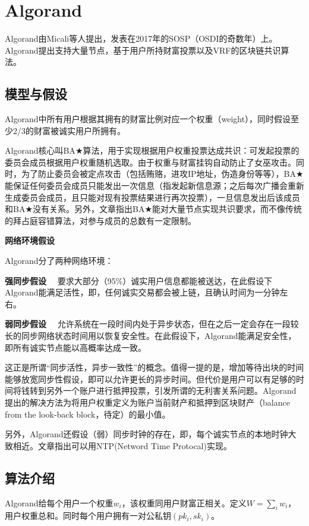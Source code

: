 \section{Algorand}
Algorand由Micali等人提出，发表在2017年的SOSP（OSDI的奇数年）上\cite{gilad2017algorand}。Algorand提出支持大量节点，基于用户所持财富投票以及VRF的区块链共识算法。	
\subsection{模型与假设}
Algorand中所有用户根据其拥有的财富比例对应一个权重（weight），同时假设至少2/3的财富被诚实用户所拥有。	

Algorand核心叫BA$\bigstar$算法，用于实现根据用户权重投票达成共识：可发起投票的委员会成员根据用户权重随机选取。由于权重与财富挂钩自动防止了女巫攻击。同时，为了防止委员会被定点攻击（包括贿赂，进攻IP地址，伪造身份等等），BA$\bigstar$能保证任何委员会成员只能发出一次信息（指发起新信息源；之后每次广播会重新生成委员会成员，且只能对现有投票结果进行再次投票），一旦信息发出后该成员和BA$\bigstar$没有关系。另外，文章指出BA$\bigstar$能对大量节点实现共识要求，而不像传统的拜占庭容错算法，对参与成员的总数有一定限制。

\textbf{网络环境假设}

Algorand分了两种网络环境：

\textbf{强同步假设} ~~要求大部分（95$\%$）诚实用户信息都能被送达，在此假设下Algorand能满足活性，即，任何诚实交易都会被上链，且确认时间为一分钟左右。

\textbf{弱同步假设} ~~允许系统在一段时间内处于异步状态，但在之后一定会存在一段较长的同步网络状态时间用以恢复安全性。在此假设下，Algorand能满足安全性，即所有诚实节点能以高概率达成一致。

这正是所谓“同步活性，异步一致性”的概念。值得一提的是，增加等待出块的时间能够放宽同步性假设，即可以允许更长的异步时间。但代价是用户可以有足够的时间将钱转到另外一个账户进行抵押投票，引发所谓的无利害关系问题。Algorand提出的解决方法为将用户权重定义为账户当前财产和抵押到区块财产（balance from the look-back block，待定）的最小值。

另外，Algorand还假设（弱）同步时钟的存在，即，每个诚实节点的本地时钟大致相近。文章指出可以用NTP(Netword Time Protocal)实现。

\subsection{算法介绍}
Algorand给每个用户一个权重$w_i$，该权重同用户财富正相关。定义$W=\sum_i w_i$，用户权重总和。同时每个用户拥有一对公私钥$(pk_i,sk_i)$。

